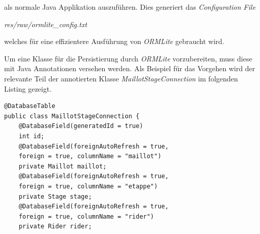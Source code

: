 als normale Java Applikation auszuführen. Dies generiert das \textit{Configuration File}

\textit{res/raw/ormlite\_config.txt}

welches für eine effizientere Ausführung von \textit{ORMLite} gebraucht wird.

Um eine Klasse für die Persistierung durch \textit{ORMLite} vorzubereiten, muss diese mit Java Annotationen versehen werden. Als Beispiel für das Vorgehen wird der relevante Teil der annotierten Klasse \textit{MaillotStageConnection} im folgenden Listing gezeigt.

\begin{lstlisting}
@DatabaseTable
public class MaillotStageConnection {
	@DatabaseField(generatedId = true)
	int id;
	@DatabaseField(foreignAutoRefresh = true,
	foreign = true, columnName = "maillot")
	private Maillot maillot;
	@DatabaseField(foreignAutoRefresh = true,
	foreign = true, columnName = "etappe")
	private Stage stage;
	@DatabaseField(foreignAutoRefresh = true,
	foreign = true, columnName = "rider")
	private Rider rider;
\end{lstlisting}





